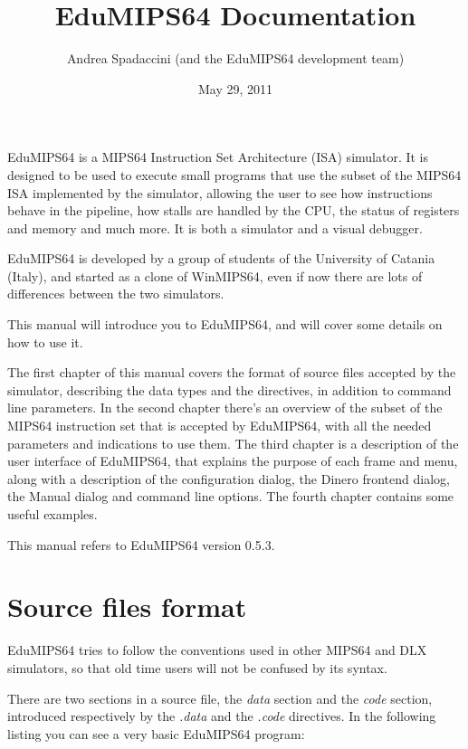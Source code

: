 \documentclass[letterpaper,10pt,english]{sphinxmanual}
\title{EduMIPS64 Documentation}
\date{May 29, 2011}
\author{Andrea Spadaccini (and the EduMIPS64 development team)}
\begin{document}
\maketitle
\tableofcontents
{}\label{index::doc}


EduMIPS64 is a MIPS64 Instruction Set Architecture (ISA) simulator. It is designed to
be used to execute small programs that use the subset of the MIPS64 ISA
implemented by the simulator, allowing the user to see how instructions behave
in the pipeline, how stalls are handled by the CPU, the status of registers and
memory and much more. It is both a simulator and a visual debugger.

EduMIPS64 is developed by a group of students of the University of Catania (Italy),
and started as a clone of WinMIPS64, even if now there are lots of differences
between the two simulators.

This manual will introduce you to EduMIPS64, and will cover some details on how to
use it.

The first chapter of this manual covers the format of source files accepted by
the simulator, describing the data types and the directives, in addition to
command line parameters. In the second chapter there's an overview of the subset
of the MIPS64 instruction set that is accepted by EduMIPS64, with all the needed
parameters and indications to use them. The third chapter is a description of
the user interface of EduMIPS64, that explains the purpose of each frame and menu,
along with a description of the configuration dialog, the Dinero frontend
dialog, the Manual dialog and command line options. The fourth chapter contains some useful examples.

This manual refers to EduMIPS64 version 0.5.3.


\chapter{Source files format}
\label{source-files-format:source-files-format}\label{source-files-format::doc}\label{source-files-format:welcome-to-the-edumips64-documentation}
EduMIPS64 tries to follow the conventions used in other MIPS64 and DLX simulators, so
that old time users will not be confused by its syntax.

There are two sections in a source file, the \emph{data} section and the
\emph{code} section, introduced respectively by the \emph{.data} and the
\emph{.code} directives. In the following listing you can see a very basic
EduMIPS64 program:
\end{document}
